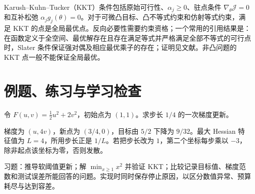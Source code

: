 Karush--Kuhn--Tucker（KKT）条件包括原始可行性、$\alpha_j\geq0$、驻点条件 $\nabla_\theta\mathcal J=0$ 和互补松弛 $\alpha_jg_j(\theta)=0$。对于可微凸目标、凸不等式约束和仿射等式约束，满足 KKT 的点是全局最优点。反向必要性需要约束资格；一个常用的引用结果是：在函数定义于全空间、最优解存在且存在满足等式并严格满足全部不等式的可行点时，Slater 条件保证强对偶及相应最优乘子的存在；证明见文献\cite[第5章]{ml-convex}。非凸问题的 KKT 点一般不能保证全局最优。

\section{例题、练习与学习检查}

\begin{example}[步长决定更新行为]
令 $F(u,v)=\tfrac12u^2+2v^2$，初始点为 $(1,1)$。求步长 $1/4$ 的一次梯度更新。
\end{example}
\begin{solve}
梯度为 $(u,4v)$，新点为 $(3/4,0)$，目标由 $5/2$ 下降为 $9/32$。最大 Hessian 特征值为 $L=4$，所用步长正是 $1/L$。若把步长改为 $1$，第二个坐标每步乘以 $-3$，除非起点该坐标为零，否则发散。
\end{solve}

习题：推导软阈值更新；解 $\min_{x\geq1}x^2$ 并验证 KKT；比较记录目标值、梯度范数和测试误差所能回答的问题。实现时同时保存停止原因，以区分数值异常、预算耗尽与达到容差。





